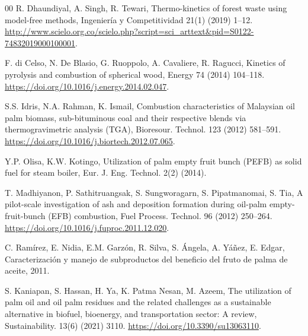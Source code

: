 \documentclass[preprint,12pt]{elsarticle}
\begin{document}
{\begin{thebibliography}{00}
R. Dhaundiyal, A. Singh, R. Tewari, Thermo-kinetics of forest waste using model-free methods, 
Ingeniería y Competitividad 21(1) (2019) 1--12. 
\href{http://www.scielo.org.co/scielo.php?script=sci_arttext&pid=S0122-74832019000100001}{http://www.scielo.org.co/scielo.php?script=sci_arttext&pid=S0122-74832019000100001}.

F. di Celso, N. De Blasio, G. Ruoppolo, A. Cavaliere, R. Ragucci, 
Kinetics of pyrolysis and combustion of spherical wood, 
Energy 74 (2014) 104--118. 
\href{https://doi.org/10.1016/j.energy.2014.02.047}{https://doi.org/10.1016/j.energy.2014.02.047}.


 S.S. Idris, N.A. Rahman, K. Ismail, Combustion characteristics of Malaysian oil palm biomass, sub-bituminous coal and their respective blends via thermogravimetric analysis (TGA), Bioresour. Technol. 123 (2012) 581--591. \href{https://doi.org/10.1016/j.biortech.2012.07.065}{https://doi.org/10.1016/j.biortech.2012.07.065}.

 Y.P. Olisa, K.W. Kotingo, Utilization of palm empty fruit bunch (PEFB) as solid fuel for steam boiler, Eur. J. Eng. Technol. 2(2) (2014).



 T. Madhiyanon, P. Sathitruangsak, S. Sungworagarn, S. Pipatmanomai, S. Tia, A pilot-scale investigation of ash and deposition formation during oil-palm empty-fruit-bunch (EFB) combustion, Fuel Process. Technol. 96 (2012) 250--264. \href{https://doi.org/10.1016/j.fuproc.2011.12.020}{https://doi.org/10.1016/j.fuproc.2011.12.020}.



 C. Ramírez, E. Nidia, E.M. Garzón, R. Silva, S. Ángela, A. Yáñez, E. Edgar, Caracterización y manejo de subproductos del beneficio del fruto de palma de aceite, 2011.




 S. Kaniapan, S. Hassan, H. Ya, K. Patma Nesan, M. Azeem, The utilization of palm oil and oil palm residues and the related challenges as a sustainable alternative in biofuel, bioenergy, and transportation sector: A review, Sustainability. 13(6) (2021) 3110. \href{https://doi.org/10.3390/su13063110}{https://doi.org/10.3390/su13063110}.




\end{thebibliography}}
\end{document}
